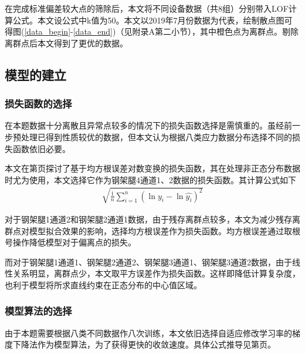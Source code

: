 \documentclass[withoutpreface,bwprint]{cumcmthesis}  %
\begin{document}
        在完成标准偏差较大点的筛除后，本文将不同设备数据（共8组）分别带入LOF计算公式。本文设公式中k值为50。本文以2019年7月份数据为代表，绘制散点图可得图(\ref{data_begin}-\ref{data_end})（见附录A第二小节），其中橙色点为离群点。剔除离群点后本文得到了更优的数据。
       
        
        \subsection{模型的建立}
        \subsubsection{损失函数的选择}
        在本题数据十分离散且异常点较多的情况下的损失函数选择是需慎重的。虽经前一步预处理已得到性质较优的数据，但本文认为根据八类应力数据分布选择不同的损失函数依旧必要。

        本文在第\pageref{model_def}页探讨了基于均方根误差对数变换的损失函数，其在处理非正态分布数据时尤为使用，本文选择它作为钢架腿4通道1、2数据的损失函数。其计算公式如下
        \begin{align}
            \;\sqrt{\frac{1}{n}\sum_{i=1}^{n} (\ln{y_i} -\ln{\hat{y_i} })^{2} }\;
        \end{align}

        对于钢架腿1通道2和钢架腿2通道1数据，由于残存离群点较多，本文为减少残存离群点对模型拟合效果的影响，选择均方根误差作为损失函数。均方根误差通过取根号操作降低模型对于偏离点的损失。

        而对于钢架腿1通道1、钢架腿2通道2、钢架腿3通道1、钢架腿3通道2数据，由于线性关系明显，离群点少，本文取平方误差作为损失函数。这样即降低计算复杂度，也利于模型将所求直线约束在正态分布的中心值区域。

        \subsubsection{模型算法的选择}
        由于本题需要根据八类不同数据作八次训练，本文依旧选择自适应修改学习率的梯度下降法作为模型算法，为了获得更快的收敛速度。具体公式推导见第\pageref{grad}页。
\end{document}
